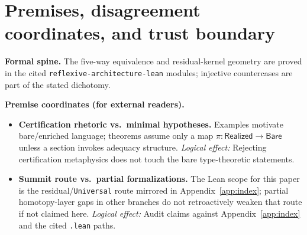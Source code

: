 \documentclass[11pt,a4paper]{article}
\newenvironment{keybox}[1]{%
  \Needspace*{8\baselineskip}%
  \begin{tcolorbox}[
    enhanced,
    breakable=false,
    colback=blue!5,
    colframe=blue!45!black,
    coltitle=black,
    colbacktitle=blue!14,
    boxrule=0.85pt,
    arc=2.5pt,
    left=9pt, right=9pt, top=6pt, bottom=6pt,
    titlerule=0.55pt,
    fonttitle=\bfseries,
    title={#1},
    before upper=\raggedright,
    before skip=0.9\baselineskip,
    after skip=0.9\baselineskip
  ]%
}{%
  \end{tcolorbox}%
}
\theoremstyle{plain}
\theoremstyle{definition}
\theoremstyle{remark}
\newcommand{\Bare}{\mathsf{Bare}}
\newcommand{\Real}{\mathsf{Realized}}
\newcommand{\compare}{\pi}
\begin{document}
\begin{abstract}
\textbf{Trust boundary:} Universal claims are theorems in Lean for arbitrary types and comparison maps in the \texttt{ReflexiveArchitecture.Universal} hierarchy (Appendix~\ref{app:index}); adequacy hypotheses are explicit where enrichment is forced. \emph{Reflexive-closure-lean} supplies a small additional bridge (map forgetting, representation/remainder interfaces, and class-level invariants) named in Remark~\ref{rem:structured-forgetting-lean}; the physical reading of conservation as ``law'' remains interpretive (\S\ref{sec:representation-conservation}). Philosophical claims elsewhere in \S\ref{sec:representation-as-structured-forgetting} are interpretive unless noted as restating the formal fiber geometry or those abstract interfaces.
\end{abstract}

\section{Premises, disagreement coordinates, and trust boundary}\label{sec:premises-geometry-maps-forget}
\begin{keybox}{Where disagreement can (and cannot) live}
\textbf{Formal spine.}
The five-way equivalence and residual-kernel geometry are proved in the cited \texttt{reflexive-architecture-lean} modules; injective countercases are part of the stated dichotomy.

\medskip
\textbf{Premise coordinates (for external readers).}
{\raggedright
\begin{itemize}[leftmargin=2em]
\item \textbf{Certification rhetoric vs.\ minimal hypotheses.} Examples motivate bare/enriched language; theorems assume only a map \(\compare : \Real \to \Bare\) unless a section invokes adequacy structure.
  \emph{Logical effect:} Rejecting certification metaphysics does not touch the bare type-theoretic statements.
\item \textbf{Summit route vs.\ partial formalizations.} The Lean scope for this paper is the residual/\texttt{Universal} route mirrored in Appendix~\ref{app:index}; partial homotopy-layer gaps in other branches do not retroactively weaken that route if not claimed here.
  \emph{Logical effect:} Audit claims against Appendix~\ref{app:index} and the cited \texttt{.lean} paths.
\end{itemize}
\par}
\end{keybox}

\tableofcontents
\end{document}
